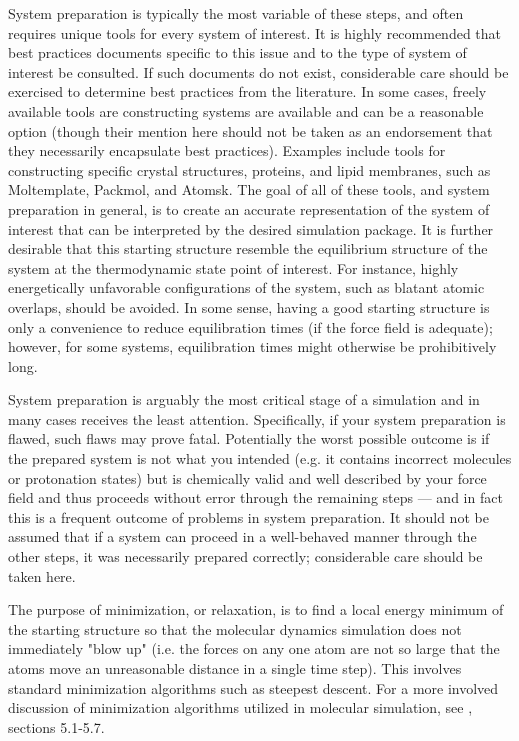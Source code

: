 \documentclass[9pt,bestpractices]{livecoms}
\begin{document}
System preparation is typically the most variable of these steps, and often requires unique tools for every system of interest.
It is highly recommended that best practices documents specific to this issue and to the type of system of interest be consulted.
If such documents do not exist, considerable care should be exercised to determine best practices from the literature.
In some cases, freely available tools are constructing systems are available and can be a reasonable option (though their mention here should not be taken as an endorsement that they necessarily encapsulate best practices).
Examples include tools for constructing specific crystal structures, proteins, and lipid membranes, such as Moltemplate, Packmol, and Atomsk.
The goal of all of these tools, and system preparation in general, is to create an accurate representation of the system of interest that can be interpreted by the desired simulation package.
It is further desirable that this starting structure resemble the equilibrium structure of the system at the thermodynamic state point of interest.
For instance, highly energetically unfavorable configurations of the system, such as blatant atomic overlaps, should be avoided.
In some sense, having a good starting structure is only a convenience to reduce equilibration times (if the force field is adequate); however, for some systems, equilibration times might otherwise be prohibitively long.

System preparation is arguably the most critical stage of a simulation and in many cases receives the least attention.
Specifically, if your system preparation is flawed, such flaws may prove fatal. 
Potentially the worst possible outcome is if the prepared system is not what you intended (e.g. it contains incorrect molecules or protonation states) but is chemically valid and well described by your force field and thus proceeds without error through the remaining steps --- and in fact this is a  frequent outcome of problems in system preparation.
It should not be assumed that if a system can proceed in a well-behaved manner through the other steps, it was necessarily prepared correctly; considerable care should be taken here.

The purpose of minimization, or relaxation, is to find a local energy minimum of the starting structure so that the molecular dynamics simulation does not immediately "blow up" (i.e. the forces on any one atom are not so large that the atoms move an unreasonable distance in a single time step).
This involves standard minimization algorithms such as steepest descent.
For a more involved discussion of minimization algorithms utilized in molecular simulation, see \citet{LeachBook}, sections 5.1-5.7.
\end{document}
